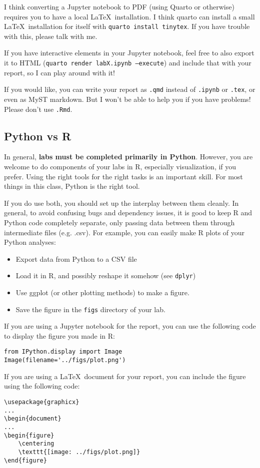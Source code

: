 \documentclass[letterpaper,12pt]{article}
\begin{document}
I think converting a Jupyter notebook to PDF (using Quarto or otherwise) requires you to have a local \LaTeX\ installation. I think quarto can install a small \LaTeX\ installation for itself with \texttt{quarto install tinytex}. If you have trouble with this, please talk with me.

If you have interactive elements in your Jupyter notebook, feel free to also export it to HTML (\texttt{quarto render labX.ipynb --execute}) and include that with your report, so I can play around with it!

If you would like, you can write your report as \texttt{.qmd} instead of \texttt{.ipynb} or \texttt{.tex}, or even as MyST markdown. But I won't be able to help you if you have problems! Please don't use \texttt{.Rmd}.

\subsection{Python vs R}
In general, \textbf{labs must be completed primarily in Python}. However, you are welcome to do components of your labs in R, especially visualization, if you prefer. Using the right tools for the right tasks is an important skill. For most things in this class, Python is the right tool.

If you do use both, you should set up the interplay between them cleanly. In general, to avoid confusing bugs and dependency issues, it is good to keep R and Python code completely separate, only passing data between them through intermediate files (e.g. .csv). For example, you can easily make R plots of your Python analyses:
\begin{itemize}
    \item Export data from Python to a CSV file
    \item Load it in R, and possibly reshape it somehow (see \texttt{dplyr})
    \item Use ggplot (or other plotting methods) to make a figure.
    \item Save the figure in the \texttt{figs} directory of your lab.
\end{itemize}
If you are using a Jupyter notebook for the report, you can use the following code to display the figure you made in R:
\begin{verbatim}
from IPython.display import Image
Image(filename='../figs/plot.png')
\end{verbatim}
If you are using a \LaTeX\ document for your report, you can include the figure using the following code:
\begin{verbatim}
\usepackage{graphicx}
...
\begin{document}
...
\begin{figure}
    \centering
    \texttt{[image: ../figs/plot.png]}
\end{figure}
\end{verbatim}
\end{document}
